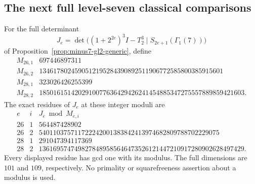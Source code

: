 \subsection{The next full level-seven classical comparisons}
\label{sec:gl2-minus7-higher4}

\begin{proposition}
\label{prop:minus7-gl2-higher4}
For the full determinant
\[
 J_e=\det\bigl((1+2^{2e})^3I-T_2^3\mid
                  S_{2e+1}(\Gamma_1(7))\bigr)
\]
of Proposition~\ref{prop:minus7-gl2-generic}, define
\[
\begin{array}{c|r}
M_{26,1}&697446897311\\
M_{26,2}&1346178024590512195284390892511906772585800385915601\\
M_{28,1}&323026426255399\\
M_{28,2}&1850161514202910077636429426241454885347275557889859421603.
\end{array}
\tag{G7H4.1}
\]
The exact residues of \(J_e\) at these integer moduli are
\[
\begin{array}{c|c|r}
e&i&J_e\bmod M_{e,i}\\ \hline
26&1&564487428902\\
26&2&540110375711722242001383842413974682809788702229075\\
28&1&291047394117369\\
28&2&1361695747498278489585646473526121447210917280902628497429.
\end{array}
\tag{G7H4.2}
\]
Every displayed residue has gcd one with its modulus.
The full dimensions are \(101\) and \(109\), respectively.
No primality or squarefreeness assertion about a modulus is used.
\end{proposition}

